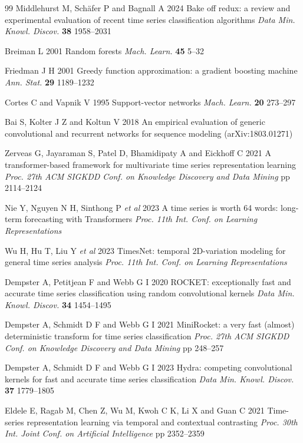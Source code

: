\documentclass{iopjournal}
\begin{document}
\begin{thebibliography}{99}
 Middlehurst M, Sch\"afer P and Bagnall A 2024 Bake off redux: a review and experimental evaluation of recent time series classification algorithms \textit{Data Min. Knowl. Discov.} \textbf{38} 1958--2031

 Breiman L 2001 Random forests \textit{Mach. Learn.} \textbf{45} 5--32

 Friedman J H 2001 Greedy function approximation: a gradient boosting machine \textit{Ann. Stat.} \textbf{29} 1189--1232

 Cortes C and Vapnik V 1995 Support-vector networks \textit{Mach. Learn.} \textbf{20} 273--297

 Bai S, Kolter J Z and Koltun V 2018 An empirical evaluation of generic convolutional and recurrent networks for sequence modeling (arXiv:1803.01271)

 Zerveas G, Jayaraman S, Patel D, Bhamidipaty A and Eickhoff C 2021 A transformer-based framework for multivariate time series representation learning \textit{Proc. 27th ACM SIGKDD Conf. on Knowledge Discovery and Data Mining} pp 2114--2124

 Nie Y, Nguyen N H, Sinthong P \textit{et al} 2023 A time series is worth 64 words: long-term forecasting with Transformers \textit{Proc. 11th Int. Conf. on Learning Representations}

 Wu H, Hu T, Liu Y \textit{et al} 2023 TimesNet: temporal 2D-variation modeling for general time series analysis \textit{Proc. 11th Int. Conf. on Learning Representations}

 Dempster A, Petitjean F and Webb G I 2020 ROCKET: exceptionally fast and accurate time series classification using random convolutional kernels \textit{Data Min. Knowl. Discov.} \textbf{34} 1454--1495

 Dempster A, Schmidt D F and Webb G I 2021 MiniRocket: a very fast (almost) deterministic transform for time series classification \textit{Proc. 27th ACM SIGKDD Conf. on Knowledge Discovery and Data Mining} pp 248--257

 Dempster A, Schmidt D F and Webb G I 2023 Hydra: competing convolutional kernels for fast and accurate time series classification \textit{Data Min. Knowl. Discov.} \textbf{37} 1779--1805

 Eldele E, Ragab M, Chen Z, Wu M, Kwoh C K, Li X and Guan C 2021 Time-series representation learning via temporal and contextual contrasting \textit{Proc. 30th Int. Joint Conf. on Artificial Intelligence} pp 2352--2359


\end{thebibliography}
\end{document}
